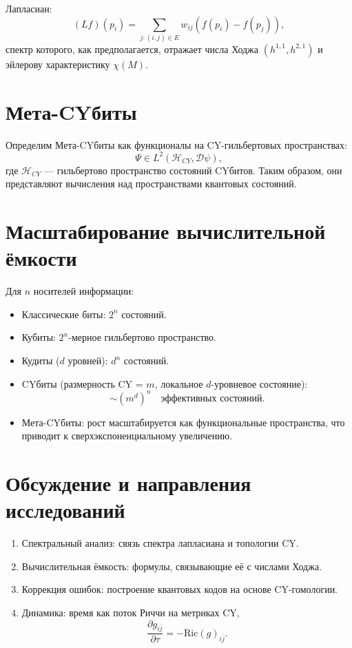 \documentclass[12pt,a4paper]{article}
\begin{document}
Лапласиан:
\[
(Lf)(p_i) = \sum_{j:(i,j)\in E} w_{ij}(f(p_i)-f(p_j)),
\]
спектр которого, как предполагается, отражает числа Ходжа $(h^{1,1},h^{2,1})$ 
и эйлерову характеристику $\chi(M)$.  

\section{Мета-CYбиты}
Определим Мета-CYбиты как функционалы на CY-гильбертовых пространствах:
\[
\Psi \in L^2(\mathcal{H}_{CY}, \mathcal{D}\psi),
\]
где $\mathcal{H}_{CY}$ — гильбертово пространство состояний CYбитов.  
Таким образом, они представляют вычисления над пространствами квантовых состояний.  

\section{Масштабирование вычислительной ёмкости}
Для $n$ носителей информации:
\begin{itemize}
\item Классические биты: $2^n$ состояний.  
\item Кубиты: $2^n$-мерное гильбертово пространство.  
\item Кудиты ($d$ уровней): $d^n$ состояний.  
\item CYбиты (размерность CY = $m$, локальное $d$-уровневое состояние): 
\[
\sim (m^d)^n \quad \text{эффективных состояний}.
\]
\item Мета-CYбиты: рост масштабируется как функциональные пространства, 
что приводит к сверхэкспоненциальному увеличению.  
\end{itemize}

\section{Обсуждение и направления исследований}
\begin{enumerate}
\item Спектральный анализ: связь спектра лапласиана и топологии CY.  
\item Вычислительная ёмкость: формулы, связывающие её с числами Ходжа.  
\item Коррекция ошибок: построение квантовых кодов на основе CY-гомологии.  
\item Динамика: время как поток Риччи на метриках CY,
\[
\frac{\partial g_{i\bar{j}}}{\partial \tau} = - \mathrm{Ric}(g)_{i\bar{j}}.
\]
\end{enumerate}
\end{document}
